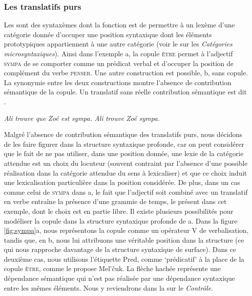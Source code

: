 \subsubsection{Les translatifs purs} 
Les  sont des syntaxèmes dont la fonction est de permettre à un lexème d’une catégorie donnée d’occuper une position syntaxique dont les éléments prototypiques appartiennent à une autre catégorie (voir le  sur les \textit{Catégories microsyntaxiques}). Ainsi dans l’exemple a, la copule \textsc{être} permet à l’adjectif \textsc{sympa} de se comporter comme un prédicat verbal et d’occuper la position de complément du verbe \textsc{penser}. Une autre construction est possible, b, sans copule. La synonymie entre les deux constructions montre l’absence de contribution sémantique de la copule. Un translatif sans réelle contribution sémantique est dit .

\ea\label{ex:sympa}
    \ea \textit{Ali trouve que Zoé est sympa.}
\ex \textit{Ali trouve Zoé sympa.}\z\z

Malgré l’absence de contribution sémantique des translatifs purs, nous décidons de les faire figurer dans la structure syntaxique profonde, car on peut considérer que le fait de ne pas utiliser, dans une position donnée, une lexie de la catégorie attendue est un choix du locuteur (souvent contraint par l’absence d’une possible réalisation dans la catégorie attendue du sens à lexicaliser) et que ce choix induit une lexicalisation particulière dans la position considérée. De plus, dans un cas comme celui de \textsc{sympa} dans a, le fait que l’adjectif soit combiné avec un translatif en verbe entraîne la présence d’une grammie de temps, le présent dans cet exemple, dont le choix est en partie libre. 
Il existe plusieurs possibilités pour modéliser la copule dans la structure syntaxique profonde de a. Dans la figure \ref{fig:sympa}a, nous représentons la copule comme un opérateur V de verbalisation, tandis que, en b, nous lui attribuons une véritable position dans la structure (ce qui nous rapproche davantage de la structure syntaxique de surface). Dans ce deuxième cas, nous utilisons l’étiquette Pred, comme ‘prédicatif’ à la place de la copule \textsc{être}, comme le propose Mel’čuk. La flèche hachée représente une dépendance sémantique qui n’est pas réalisée par une dépendance syntaxique entre les mêmes éléments. Nous y reviendrons dans la  sur le \textit{Contrôle}.

